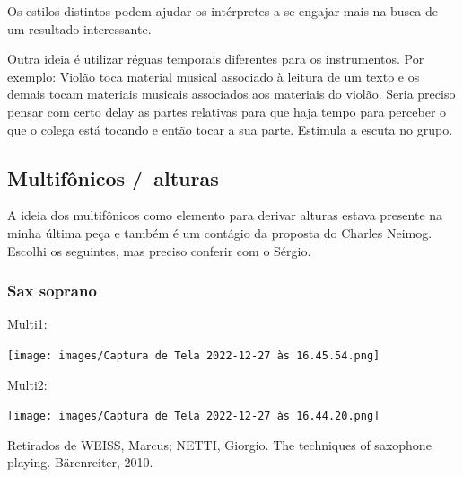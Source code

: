 \documentclass[a4paper]{article}
\begin{document}
Os estilos distintos podem ajudar os intérpretes a se engajar mais na busca de um resultado interessante.

Outra ideia é utilizar réguas temporais diferentes para os instrumentos. Por exemplo: Violão toca material musical associado à leitura de um texto e os demais tocam materiais musicais associados aos materiais do violão. Seria preciso pensar com certo delay as partes relativas para que haja tempo para perceber o que o colega está tocando e então tocar a sua parte. Estimula a escuta no grupo.

\subsection*{Multifônicos / alturas}
\label{sec:orgae2937a}
A ideia dos multifônicos como elemento para derivar alturas estava presente na minha última peça e também é um contágio da proposta do Charles Neimog. Escolhi os seguintes, mas preciso conferir com o Sérgio.

\subsubsection*{Sax soprano}
\label{sec:org7b67ee9}
Multi1:
\begin{center}
\texttt{[image: images/Captura de Tela 2022-12-27 às 16.45.54.png]}
\end{center}

Multi2:
\begin{center}
\texttt{[image: images/Captura de Tela 2022-12-27 às 16.44.20.png]}
\end{center}

Retirados de WEISS, Marcus; NETTI, Giorgio. The techniques of saxophone playing. Bärenreiter, 2010.
\end{document}
